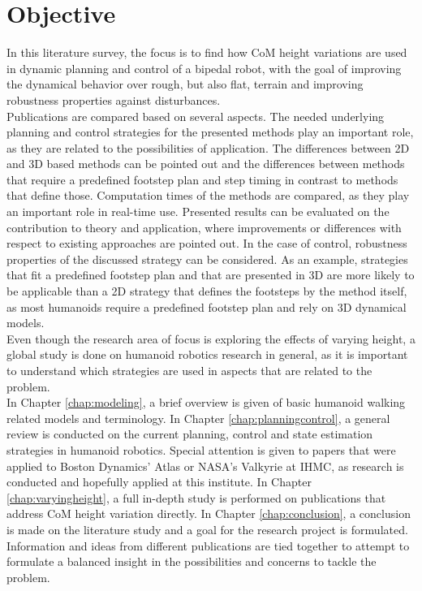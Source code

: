 \section{Objective}
In this literature survey, the focus is to find how \ac{CoM} height variations are used in dynamic planning and control of a bipedal robot, with the goal of improving the dynamical behavior over rough, but also flat, terrain and improving robustness properties against disturbances. \\
Publications are compared based on several aspects. The needed underlying planning and control strategies for the presented methods play an important role, as they are related to the possibilities of application. The differences between \ac{2D} and \ac{3D} based methods can be pointed out and the differences between methods that require a predefined footstep plan and step timing in contrast to methods that define those. Computation times of the methods are compared, as they play an important role in real-time use. Presented results can be evaluated on the contribution to theory and application, where improvements or differences with respect to existing approaches are pointed out. In the case of control, robustness properties of the discussed strategy can be considered. As an example, strategies that fit a predefined footstep plan and that are presented in \ac{3D} are more likely to be applicable than a \ac{2D} strategy that defines the footsteps by the method itself, as most humanoids require a predefined footstep plan and rely on \ac{3D} dynamical models. \\
Even though the research area of focus is exploring the effects of varying height, a global study is done on humanoid robotics research in general, as it is important to understand which strategies are used in aspects that are related to the problem. \\
In Chapter \ref{chap:modeling}, a brief overview is given of basic humanoid walking related models and terminology. In Chapter \ref{chap:planningcontrol}, a general review is conducted on the current planning, control and state estimation strategies in humanoid robotics. Special attention is given to papers that were applied to Boston Dynamics' Atlas or NASA's Valkyrie at IHMC, as research is conducted and hopefully applied at this institute. In Chapter \ref{chap:varyingheight}, a full in-depth study is performed on publications that address \ac{CoM} height variation directly. In Chapter \ref{chap:conclusion}, a conclusion is made on the literature study and a goal for the research project is formulated. Information and ideas from different publications are tied together to attempt to formulate a balanced insight in the possibilities and concerns to tackle the problem.
